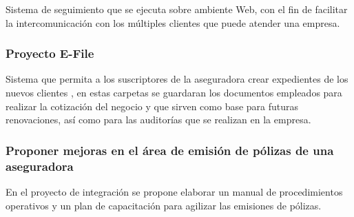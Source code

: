 Sistema  de  seguimiento  que  se  
ejecuta sobre ambiente Web, con el fin de facilitar la intercomunicación con los múltiples clientes 
que puede atender una empresa.

\subsubsection*{Proyecto E-File \cite{pro:zurich}}

Sistema  que  permita  a  los  suscriptores  de  la 
aseguradora  crear expedientes de los nuevos clientes   , en 
estas   carpetas   se   guardaran   los   documentos   empleados   para   
realizar  la  cotización  del  negocio  y  que  sirven  como  base  para  
futuras 
renovaciones, 
así como para las auditorías que se realizan 
en la empresa. 

\subsubsection*{Proponer mejoras en el área de emisión de pólizas de una aseguradora \cite{pro:emi}}

En  el  proyecto  de  integración  se  propone  elaborar un manual de procedimientos operativos y un plan de capacitación para agilizar las emisiones de pólizas.

